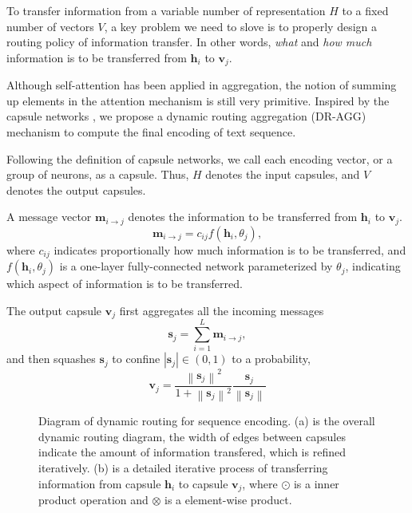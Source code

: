 \documentclass[11pt]{article}
\newcommand{\norm}[1]{\left\lVert#1\right\rVert}
\def\bv{\mathbf{v}}
\def\h{\textbf{h}}
\def\bh{\mathbf{h}}
\def\s{\mathbf{s}}
\def\m{\mathbf{m}}
\def\v{\mathbf{v}}
\def\bh{\mathbf{h}}
\begin{document}
To transfer information from a variable number of representation $H$ to a fixed number of vectors $V$,
a key problem we need to slove is to properly design a routing policy of information transfer. In other words, \textit{what} and \textit{how much} information is to be transferred from $\bh_i$ to $\bv_j$.

Although self-attention has been applied in aggregation, the notion of summing up elements in the attention mechanism is still very primitive.
Inspired by the capsule networks \cite{DBLP:conf/nips/SabourFH17}, we propose a dynamic routing aggregation (DR-AGG) mechanism to compute the final encoding of text sequence.

Following the definition of capsule networks, we call each encoding vector, or a group of neurons, as a capsule. Thus, $H$ denotes the input capsules, and $V$ denotes the output capsules.

A message vector $\m_{i\rightarrow j}$ denotes the information to be transferred from $\bh_i$ to $\bv_j$.
\begin{equation}
	\m_{i\rightarrow j} = c_{ij} f(\bh_i,\theta_j),
\end{equation}
where $c_{ij}$ indicates proportionally how much information is to be transferred, and $f(\bh_i,\theta_j)$ is a one-layer fully-connected network parameterized by $\theta_j$, indicating which aspect of information is to be transferred.

The output capsule $\v_j$ first aggregates all the incoming messages
\begin{equation} \label{eq:sss}
	\s_j = \sum_{i=1}^L \m_{i\rightarrow j},
\end{equation}
and then squashes $\s_j$ to confine $|\s_j|\in (0,1)$ to a probability,
\begin{equation}
	\label{eq:squash}
	\v_j = \frac{\norm{\s_j}^2}{1+\norm{\s_j}^2} \frac{\s_j}{\norm{\s_j}}
\end{equation}







\begin{figure}[t]
 \centering
 \hspace{2em}
  \caption{Diagram of dynamic routing for sequence encoding. (a) is the overall dynamic routing diagram, the width of edges between capsules  indicate the amount of information transfered, which is refined iteratively. (b) is a detailed iterative process of transferring information from capsule $\h_i$ to capsule $\v_j$, where $\odot$ is a inner product operation and $\otimes$ is a element-wise product.}\label{fig:dyroute}
\end{figure}
\end{document}
